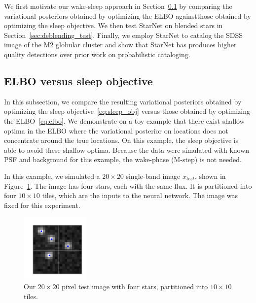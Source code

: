 
We first motivate our wake-sleep approach in Section~\ref{sec:estep_sleep_compare} by comparing the variational posteriors obtained by optimizing the ELBO againstthose obtained by optimizing the sleep objective. 
We then test StarNet on blended stars in Section~\ref{sec:deblending_test}. 
Finally, we employ StarNet to catalog the SDSS image of the M2 globular cluster and show that StarNet has produces higher quality detections over prior work on probabilistic cataloging. 


\subsection{ELBO versus sleep objective}
\label{sec:estep_sleep_compare}

In this subsection, we compare the resulting variational posteriors obtained by optimizing the sleep objective~\eqref{eq:sleep_obj} 
versus those obtained by optimizing the ELBO~\eqref{eq:elbo}.
We demonstrate on a toy example that there exist shallow optima in the ELBO where the variational posterior on locations does not concentrate around the true locations.
On this example, the sleep objective is able to avoid these shallow optima. 
Because the data were simulated with known PSF and background for this example, the wake-phase (M-step) is not needed. 

In this example, we simulated a $20\times20$ single-band image $x_{test}$, shown in Figure~\ref{fig:toy_example}.
The image has four stars, each with the same flux. It is partitioned into four $10\times 10$ tiles, which are the inputs to the neural network. 
The image was fixed for this experiment. 

\begin{figure}[!h]
    \centering
    \vspace{-1em}
    \includegraphics[width = 0.3\textwidth]{figures/vi_sleep_ex_figure.png}
    \vspace{-1.7em}
    \caption{Our $20\times 20$ pixel test image with four stars, partitioned into $10\times 10$ tiles. }
    \label{fig:toy_example}
\end{figure}

